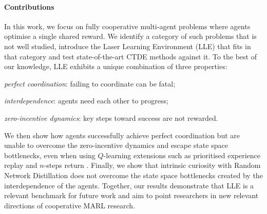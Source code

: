 \paragraph{Contributions} In this work, we focus on fully cooperative multi-agent problems where agents optimise a single shared reward. We identify a category of such problems that is not well studied, introduce the Laser Learning Environment (LLE) that fits in that category and test state-of-the-art CTDE methods against it. To the best of our knowledge, LLE exhibits a unique combination of three properties: 
\begin{enumerate*}[label=\arabic*)]
    \item \textit{perfect coordination}: failing to coordinate can be fatal;
    \item \textit{interdependence}: agents need each other to progress;
    \item \textit{zero-incentive dynamics}: key steps toward success are not rewarded.
\end{enumerate*}
We then show how agents successfully achieve perfect coordination but are unable to overcome the zero-incentive dynamics and escape state space bottlenecks, even when using $Q$-learning extensions such as prioritised experience replay \citep{schaul_prioritized_2016_per} and $n$-steps return \citep{Watkins_1989_n-step-return}. Finally, we show that intrinsic curiosity with Random Network Distillation \citep{burda_exploration_2018_rnd} does not overcome the state space bottlenecks created by the interdependence of the agents. Together, our results demonstrate that LLE is a relevant benchmark for future work and aim to point researchers in new relevant directions of cooperative MARL research.


